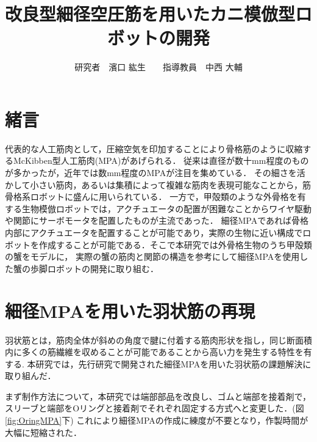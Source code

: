 \documentclass{jarticle}
\begin{document}

\title{
改良型細径空圧筋を用いたカニ模倣型ロボットの開発
}
\author{
\centering
研究者　濱口 紘生　　指導教員　中西 大輔
}

\maketitle

\thispagestyle{empty}  %

\section{緒言}

代表的な人工筋肉として，圧縮空気を印加することにより骨格筋のように収縮するMcKibben型人工筋肉(MPA)があげられる．
従来は直径が数十mm程度のものが多かったが，近年では数mm程度のMPAが注目を集めている\cite{wakimoto}．
その細さを活かして小さい筋肉，あるいは集積によって複雑な筋肉を表現可能なことから，筋骨格系ロボットに盛んに用いられている\cite{wakimoto}．
一方で，甲殻類のような外骨格を有する生物模倣ロボットでは，アクチュエータの配置が困難なことからワイヤ駆動や関節にサーボモータを配置したものが主流であった\cite{crabrobot1}．
細径MPAであれば骨格内部にアクチュエータを配置することが可能であり，実際の生物に近い構成でロボットを作成することが可能である．そこで本研究では外骨格生物のうち甲殻類の蟹をモデルに，
実際の蟹の筋肉と関節の構造を参考にして細径MPAを使用した蟹の歩脚ロボットの開発に取り組む．

\section{細径MPAを用いた羽状筋の再現}
羽状筋とは，筋肉全体が斜めの角度で腱に付着する筋肉形状を指し，同じ断面積内に多くの筋繊維を収めることが可能であることから高い力を発生する特性を有する.
本研究では，先行研究\cite{crabrobot2}で開発された細径MPAを用いた羽状筋の課題解決に取り組んだ．

まず制作方法について，本研究では端部部品を改良し、ゴムと端部を接着剤で，スリーブと端部をOリングと接着剤でそれぞれ固定する方式へと変更した．(図\ref{fig:OringMPA}下)
これにより細径MPAの作成に練度が不要となり，作製時間が大幅に短縮された．
\end{document}
